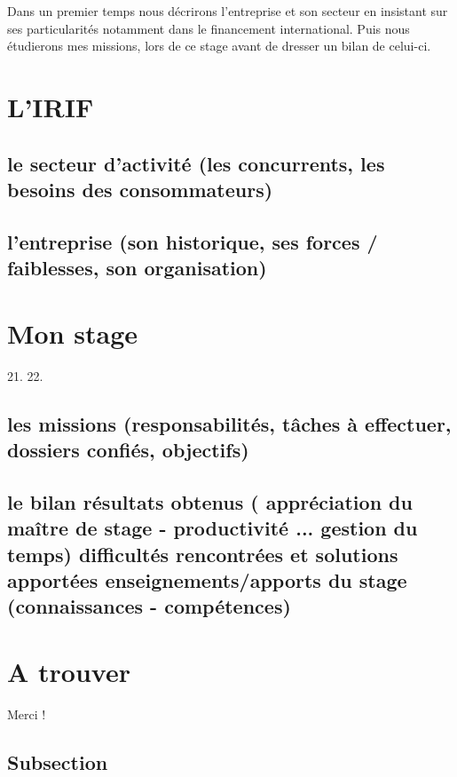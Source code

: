 \documentclass{article}
\begin{document}
Dans un premier temps nous décrirons l'entreprise et son secteur en insistant sur ses particularités notamment dans le financement international. Puis nous étudierons mes missions, lors de ce stage avant de dresser un bilan de celui-ci.

\newpage

\section{L'IRIF}

\subsection{le secteur d'activité (les concurrents, les besoins des consommateurs)}

\subsection{l'entreprise (son historique, ses forces / faiblesses, son organisation)}

\newpage

\section{Mon stage}

21. 
22. 

\subsection{les missions (responsabilités, tâches à effectuer, dossiers confiés, objectifs)}

\subsection{le bilan
résultats obtenus ( appréciation du maître de stage - productivité ... gestion du temps)
difficultés rencontrées et solutions apportées
enseignements/apports du stage (connaissances - compétences)}

\newpage

\section{A trouver}
Merci !

\subsection{Subsection}
\end{document}

